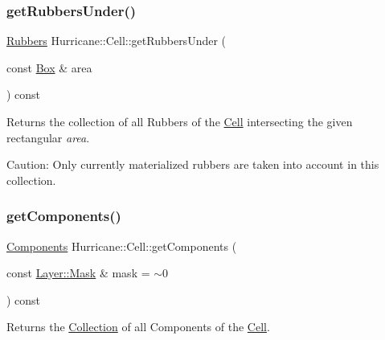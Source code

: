 \subsubsection{\texorpdfstring{get\+Rubbers\+Under()}{getRubbersUnder()}}
{\footnotesize\ttfamily \mbox{\hyperlink{namespaceHurricane_af8923abd57508cc44931a00d61b564ad}{Rubbers}} Hurricane\+::\+Cell\+::get\+Rubbers\+Under (\begin{DoxyParamCaption}\item[{const \mbox{\hyperlink{classHurricane_1_1Box}{Box}} \&}]{area }\end{DoxyParamCaption}) const}

Returns the collection of all Rubbers of the \mbox{\hyperlink{classHurricane_1_1Cell}{Cell}} intersecting the given rectangular {\itshape area}.

\begin{DoxyParagraph}{Caution\+: Only currently materialized rubbers are taken into account}
in this collection. 
\end{DoxyParagraph}
\mbox{\label{classHurricane_1_1Cell_a14cb1b1f27e75d4af5b34a9a5956d818}} 
\subsubsection{\texorpdfstring{get\+Components()}{getComponents()}}
{\footnotesize\ttfamily \mbox{\hyperlink{namespaceHurricane_a7d26d99aeb5dd6d70d51bd35d2473e72}{Components}} Hurricane\+::\+Cell\+::get\+Components (\begin{DoxyParamCaption}\item[{const \mbox{\hyperlink{classHurricane_1_1Layer_af5277c670637bd5d910237e7afe01a91}{Layer\+::\+Mask}} \&}]{mask = {\ttfamily $\sim$0} }\end{DoxyParamCaption}) const}

Returns the \mbox{\hyperlink{classHurricane_1_1Collection}{Collection}} of all Components of the \mbox{\hyperlink{classHurricane_1_1Cell}{Cell}}. \mbox{\label{classHurricane_1_1Cell_a0a3c54d755ab36fe74bd032dfd43b53a}} 
